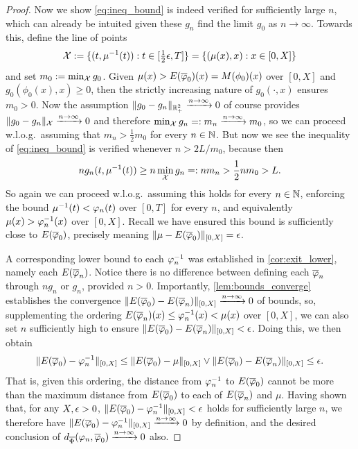 \begin{proof}
    Now we show \autoref{eq:ineq_bound} is indeed verified for sufficiently large $n$, which can already be intuited given these $g_n$ find the limit $g_0$ as $n\to\infty$. Towards this, define the line of points
    \begin{equation}
        \mathcal{X} := \{(t,\mu^{-1}(t)):t\in[\tfrac12\epsilon,T]\} = \{(\mu(x),x):x\in[0,X]\}
    \end{equation}
    and set $m_0:=\min_{\mathcal{X}} g_0$. Given $\mu(x)>E(\overline{\varphi}_0)(x)=M(\phi_0)(x)$ over $[0,X]$ and $g_0(\phi_0(x),x)\ge0$, then the strictly increasing nature of $g_0(\cdot,x)$ ensures $m_0>0$. Now the assumption $\Vert g_0 - g_n \Vert_{\mathbb{R}^2_+}\xrightarrow{n\to\infty}0$ of course provides $\Vert g_0 - g_n \Vert_{\mathcal{X}} \xrightarrow{n\to\infty}0$ and therefore $\min_{\mathcal{X}} g_n=:m_n \xrightarrow{n\to\infty} m_0$, so we can proceed w.l.o.g.~assuming that $m_n > \frac12 m_0$ for every $n\in\mathbb{N}$. But now we see the inequality of \autoref{eq:ineq_bound} is verified whenever $n>2L/m_0$, because then
    \begin{equation}
         n g_n(t,\mu^{-1}(t)) \ge n \min_{\mathcal{X}} g_n =: nm_n > \frac12 nm_0 > L.
    \end{equation}
    So again we can proceed w.l.o.g.~assuming this holds for every $n\in\mathbb{N}$, enforcing the bound $\mu^{-1}(t)<\varphi_n(t)$ over $[0,T]$ for every $n$, and equivalently $\mu(x)>\varphi_n^{-1}(x)$ over $[0,X]$. Recall we have ensured this bound is sufficiently close to $E(\overline{\varphi}_0)$, precisely meaning $\Vert\mu - E(\overline{\varphi}_0)\Vert_{[0,X]} =\epsilon$.

    A corresponding lower bound to each $\varphi_n^{-1}$ was established in \autoref{cor:exit_lower}, namely each $E(\overline{\varphi}_n)$. Notice there is no difference between defining each $\overline{\varphi}_n$ through $ng_n$ or $g_n$, provided $n>0$. Importantly, \autoref{lem:bounds_converge} establishes the convergence $\Vert E(\overline{\varphi}_0) - E(\overline{\varphi}_n) \Vert_{[0,X]}\xrightarrow{n\to\infty}0$ of bounds, so, supplementing the ordering $E(\overline{\varphi}_n)(x)\le \varphi^{-1}_n(x)<\mu(x)$ over $[0,X]$, we can also set $n$ sufficiently high to ensure $\Vert E(\overline{\varphi}_0) - E(\overline{\varphi}_n) \Vert_{[0,X]}<\epsilon$. Doing this, we then obtain
    \begin{equation}
        \Vert E(\overline{\varphi}_0) - \varphi^{-1}_n \Vert_{[0,X]} \le \Vert E(\overline{\varphi}_0) - \mu \Vert_{[0,X]} \vee \Vert E(\overline{\varphi}_0) - E(\overline{\varphi}_n) \Vert_{[0,X]} \le \epsilon.
    \end{equation}
    That is, given this ordering, the distance from $\varphi^{-1}_n$ to $E(\overline{\varphi}_0)$ cannot be more than the maximum distance from $E(\overline{\varphi}_0)$ to each of $E(\overline{\varphi}_n)$ and $\mu$. Having shown that, for any $X,\epsilon>0$, $\Vert E(\overline{\varphi}_0) - \varphi^{-1}_n \Vert_{[0,X]} < \epsilon$ holds for sufficiently large $n$, we therefore have $\Vert E(\overline{\varphi}_0) - \varphi^{-1}_n \Vert_{[0,X]}\xrightarrow{n\to\infty}0$ by definition, and the desired conclusion of $d_{\overline{\Phi}}(\varphi_n,\overline{\varphi}_0)\xrightarrow{n\to\infty}0$ also.
\end{proof}

